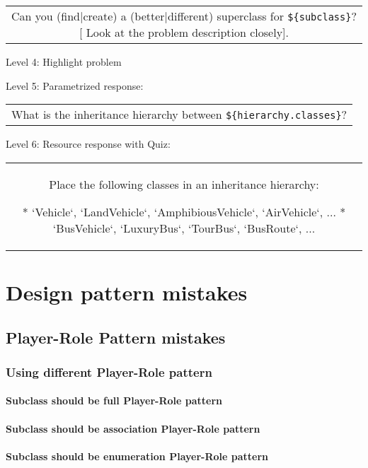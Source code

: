 \begin{tabular}{|c}
Can you (find|create) a (better|different) superclass for \verb|${subclass}|?[ Look at the problem description closely].
\end{tabular} \medskip

\noindent Level 4: Highlight problem \medskip

\noindent Level 5: Parametrized response: \medskip

\begin{tabular}{|c}
What is the inheritance hierarchy between \verb|${hierarchy.classes}|?
\end{tabular} \medskip

\noindent Level 6: Resource response with Quiz:

\begin{tabular}{|c}
Place the following classes in an inheritance hierarchy:

* `Vehicle`, `LandVehicle`, `AmphibiousVehicle`, `AirVehicle`, ...
* `BusVehicle`, `LuxuryBus`, `TourBus`, `BusRoute`, ...
\end{tabular} \medskip




\section{Design pattern mistakes}

\subsection{Player-Role Pattern mistakes}

\subsubsection{Using different Player-Role pattern}

\paragraph{Subclass should be full Player-Role pattern}


\paragraph{Subclass should be association Player-Role pattern}


\paragraph{Subclass should be enumeration Player-Role pattern}


